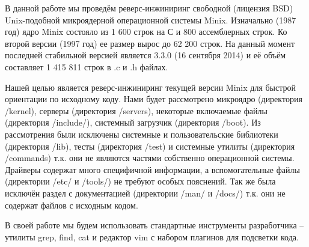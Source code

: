 В данной работе мы проведём реверс-инжиниринг свободной (лицензия BSD) Unix-подобной микроядерной операционной системы Minix. Изначально (1987 год) ядро Minix состояло из 1 600 строк на С и 800 ассемблерных строк. Ко второй версии (1997 год) ее размер вырос до 62 200 строк. На данный момент последней стабильной версией является 3.3.0 (16 сентября 2014) и её объём составляет 1 415 811 строк в .c и .h файлах.

Нашей целью является реверс-инжиниринг текущей версии Minix для быстрой ориентации по исходному коду. Нами будет рассмотрено микроядро (директория /kernel), серверы (директория /servers), некоторые включаемые файлы (директория /include/), системный загрузчик (директория /boot). Из рассмотрения были исключены системные и пользовательские библиотеки (директория /lib), тесты (директория /test) и системные утилиты (директория /commands) т.к. они не являются частями собственно операционной системы. Драйверы содержат много специфичной информации, а вспомогательные файлы (директории /etc/ и /tools/) не требуют особых пояснений. Так же была исключён раздел с документацией (директории /man/ и /docs/) т.к. они не содержат файлов с исходным кодом.

В своей работе мы будем использовать стандартные инструменты разработчика -- утилиты grep, find, cat и редактор vim с набором плагинов для подсветки кода.